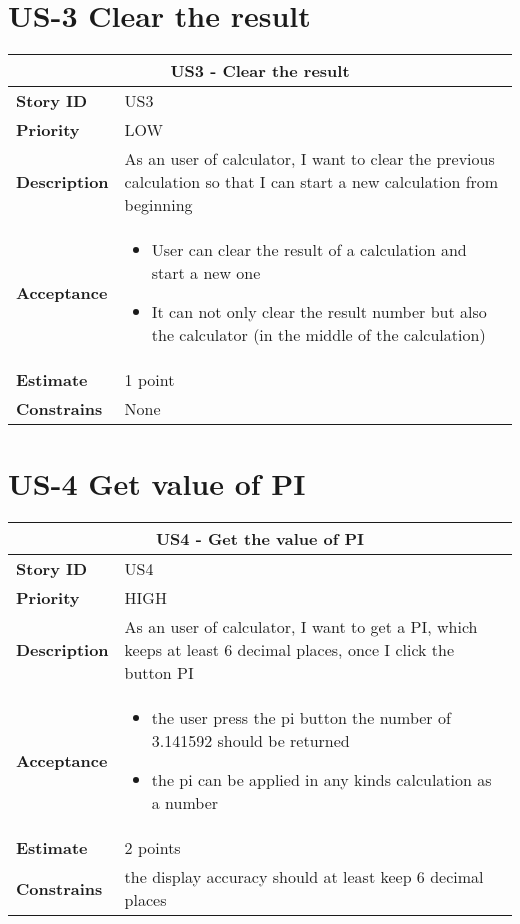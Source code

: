 \documentclass[12pt]{report}
\begin{document}
{		
		\section{US-3 Clear the result }
		\begin{tabular}{ |p{4cm}|p{10cm}| }
			\hline
			\multicolumn{2}{|c|}{US3 - Clear the result } \\
			\hline
			\textbf {Story ID}& US3 \\
			\hline
			\textbf{Priority} & LOW \\
			\hline
			\textbf{Description}   & As an user of calculator, I want to clear the previous calculation so that I can start a new calculation from beginning \\
			\hline
			\textbf{Acceptance}& 
			\begin{itemize}
				\item User can clear the result of a calculation and start a new one
				\item It can not only clear the result number but also the calculator (in the middle of the calculation)
			\end{itemize}
			
			\\
			\hline
			\textbf{Estimate} & 1 point \\
			\hline
			\textbf{Constrains}& None \\
			\hline
		\end{tabular}
		
		\section{US-4 Get value of PI}
		\begin{tabular}{ |p{4cm}|p{10cm}| }
			\hline
			\multicolumn{2}{|c|}{US4 - Get the value of PI} \\
			\hline
			\textbf {Story ID}& US4  \\
			\hline
			\textbf{Priority} & HIGH \\
			\hline
			\textbf{Description}   & As an user of calculator, I want to get a PI, which keeps at least 6 decimal places, once I click the button PI \\
			\hline
			\textbf{Acceptance}& 
			
			\begin{itemize}
				\item  the user press the pi button the number of 3.141592 should be returned
				\item  the pi can be applied in any kinds calculation as a number
			\end{itemize}
			\\
			\hline
			\textbf{Estimate} & 2 points  \\
			\hline
			\textbf{Constrains}& the display accuracy should at least keep 6 decimal places  \\
			\hline
		\end{tabular}
		
}
\end{document}
